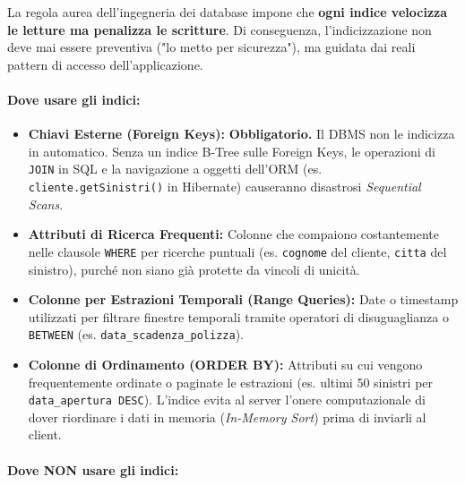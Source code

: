La regola aurea dell'ingegneria dei database impone che \textbf{ogni indice velocizza le letture ma penalizza le scritture}. Di conseguenza, l'indicizzazione non deve mai essere preventiva ("lo metto per sicurezza"), ma guidata dai reali pattern di accesso dell'applicazione.

\paragraph{Dove usare gli indici:}

\begin{itemize}
    \item \textbf{Chiavi Esterne (Foreign Keys):} \textbf{Obbligatorio.} Il DBMS non le indicizza in automatico. Senza un indice B-Tree sulle Foreign Keys, le operazioni di \texttt{JOIN} in SQL e la navigazione a oggetti dell'ORM (es. \texttt{cliente.getSinistri()} in Hibernate) causeranno disastrosi \textit{Sequential Scans}.
    \item \textbf{Attributi di Ricerca Frequenti:} Colonne che compaiono costantemente nelle clausole \texttt{WHERE} per ricerche puntuali (es. \texttt{cognome} del cliente, \texttt{citta} del sinistro), purché non siano già protette da vincoli di unicità.
    \item \textbf{Colonne per Estrazioni Temporali (Range Queries):} Date o timestamp utilizzati per filtrare finestre temporali tramite operatori di disuguaglianza o \texttt{BETWEEN} (es. \texttt{data\_scadenza\_polizza}).
    \item \textbf{Colonne di Ordinamento (ORDER BY):} Attributi su cui vengono frequentemente ordinate o paginate le estrazioni (es. ultimi 50 sinistri per \texttt{data\_apertura DESC}). L'indice evita al server l'onere computazionale di dover riordinare i dati in memoria (\textit{In-Memory Sort}) prima di inviarli al client.
\end{itemize}

\paragraph{Dove NON usare gli indici: }

